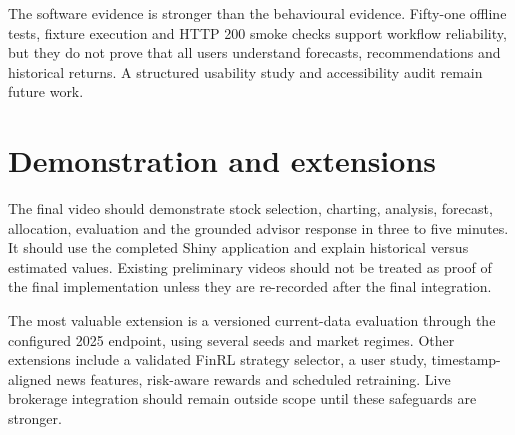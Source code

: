 The software evidence is stronger than the behavioural evidence. Fifty-one offline tests, fixture execution and HTTP 200 smoke checks support workflow reliability, but they do not prove that all users understand forecasts, recommendations and historical returns. A structured usability study and accessibility audit remain future work.

\section{Demonstration and extensions}
The final video should demonstrate stock selection, charting, analysis, forecast, allocation, evaluation and the grounded advisor response in three to five minutes. It should use the completed Shiny application and explain historical versus estimated values. Existing preliminary videos should not be treated as proof of the final implementation unless they are re-recorded after the final integration.

The most valuable extension is a versioned current-data evaluation through the configured 2025 endpoint, using several seeds and market regimes. Other extensions include a validated FinRL strategy selector, a user study, timestamp-aligned news features, risk-aware rewards and scheduled retraining. Live brokerage integration should remain outside scope until these safeguards are stronger.
